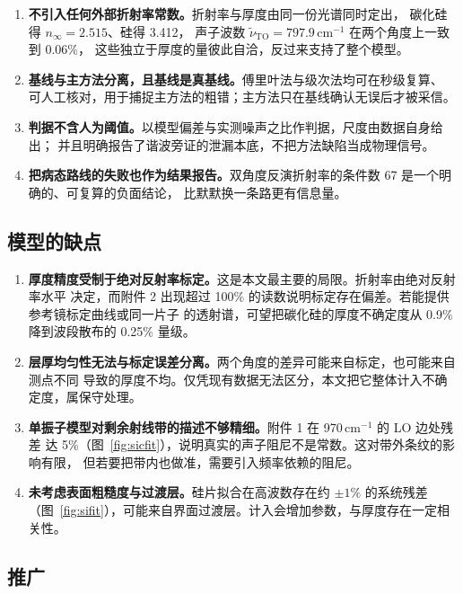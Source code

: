 \documentclass[12pt]{article}
\begin{document}
\begin{enumerate}[leftmargin=2em]
  \item \textbf{不引入任何外部折射率常数。}\;折射率与厚度由同一份光谱同时定出，
        碳化硅得 $n_\infty=2.515$、硅得 3.412，
        声子波数 $\tilde\nu_{\mathrm{TO}}=797.9$\,cm$^{-1}$ 在两个角度上一致到
0.06\%，
        这些独立于厚度的量彼此自洽，反过来支持了整个模型。
  \item \textbf{基线与主方法分离，且基线是真基线。}\;傅里叶法与级次法均可在秒级复算、
        可人工核对，用于捕捉主方法的粗错；主方法只在基线确认无误后才被采信。
  \item \textbf{判据不含人为阈值。}\;以模型偏差与实测噪声之比作判据，尺度由数据自身给出；
        并且明确报告了谐波旁证的泄漏本底，不把方法缺陷当成物理信号。
  \item \textbf{把病态路线的失败也作为结果报告。}\;双角度反演折射率的条件数
        67 是一个明确的、可复算的负面结论，
        比默默换一条路更有信息量。
\end{enumerate}

\subsection{模型的缺点}

\begin{enumerate}[leftmargin=2em]
  \item \textbf{厚度精度受制于绝对反射率标定。}\;这是本文最主要的局限。折射率由绝对反射率水平
        决定，而附件 2 出现超过 100\% 的读数说明标定存在偏差。若能提供参考镜标定曲线或同一片子
        的透射谱，可望把碳化硅的厚度不确定度从 0.9\%
        降到波段散布的 0.25\% 量级。
  \item \textbf{层厚均匀性无法与标定误差分离。}\;两个角度的差异可能来自标定，也可能来自测点不同
        导致的厚度不均。仅凭现有数据无法区分，本文把它整体计入不确定度，属保守处理。
  \item \textbf{单振子模型对剩余射线带的描述不够精细。}\;附件 1 在 970\,cm$^{-1}$ 的 LO 边处残差
        达 5\%（图~\ref{fig:sicfit}），说明真实的声子阻尼不是常数。这对带外条纹的影响有限，
        但若要把带内也做准，需要引入频率依赖的阻尼。
  \item \textbf{未考虑表面粗糙度与过渡层。}\;硅片拟合在高波数存在约 $\pm1\%$ 的系统残差
        （图~\ref{fig:sifit}），可能来自界面过渡层。计入会增加参数，与厚度存在一定相关性。
\end{enumerate}

\subsection{推广}
\end{document}
